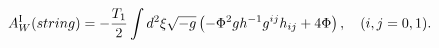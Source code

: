 \begin{equation}
A^{{\rm I}}_{W}(string)=-\frac{T_1}{2}\int d^{2}{\xi}\sqrt{-g}
\left(-{\Phi}^{2}gh^{-1}g^{ij}h_{ij}+4{\Phi}\right),\hspace{10pt}(i,j=0,1).
\end{equation}

